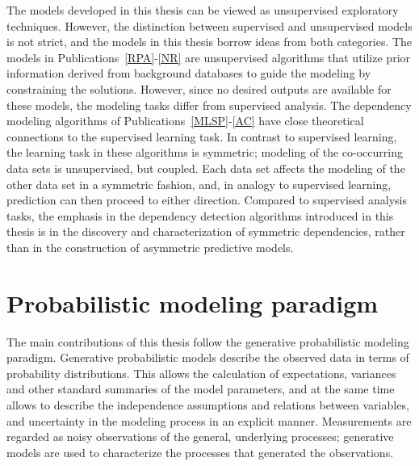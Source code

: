 The models developed in this thesis can be viewed as unsupervised
exploratory techniques. However, the distinction between supervised
and unsupervised models is not strict, and the models in this thesis
borrow ideas from both categories. The models in
Publications~\ref{RPA}-\ref{NR} are unsupervised algorithms that
utilize prior information derived from background databases to guide
the modeling by constraining the solutions.  However, since no desired
outputs are available for these models, the modeling tasks differ from
supervised analysis. The dependency modeling algorithms of
Publications~\ref{MLSP}-\ref{AC} have close theoretical connections to
the supervised learning task. In contrast to supervised learning, the
learning task in these algorithms is symmetric; modeling of the
co-occurring data sets is unsupervised, but coupled. Each data set
affects the modeling of the other data set in a symmetric fashion,
and, in analogy to supervised learning, prediction can then proceed to
either direction. Compared to supervised analysis tasks, the emphasis
in the dependency detection algorithms introduced in this thesis is in
the discovery and characterization of symmetric dependencies, rather
than in the construction of asymmetric predictive models.

\section{Probabilistic modeling paradigm}\label{sec:prob}

The main contributions of this thesis follow the generative
probabilistic modeling paradigm.  Generative probabilistic models
describe the observed data in terms of probability distributions. This
allows the calculation of expectations, variances and other standard
summaries of the model parameters, and at the same time allows to
describe the independence assumptions and relations between variables,
and uncertainty in the modeling process in an explicit manner.
Measurements are regarded as noisy observations of the general,
underlying processes; generative models are used to characterize the
processes that generated the observations.

